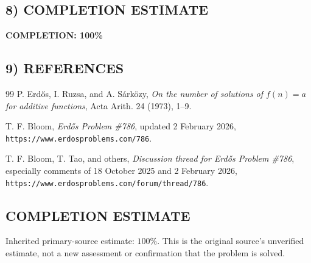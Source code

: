 \subsection*{8) COMPLETION ESTIMATE}
\textbf{COMPLETION: 100\%}

\subsection*{9) REFERENCES}
\begin{thebibliography}{99}
P. Erd\H{o}s, I. Ruzsa, and A. S\'ark\"ozy,
\emph{On the number of solutions of $f(n)=a$ for additive functions},
Acta Arith. 24 (1973), 1--9.

T. F. Bloom,
\emph{Erd\H{o}s Problem \#786}, updated 2 February 2026,
\texttt{https://www.erdosproblems.com/786}.

T. F. Bloom, T. Tao, and others,
\emph{Discussion thread for Erd\H{o}s Problem \#786}, especially comments of 18 October 2025 and 2 February 2026,
\texttt{https://www.erdosproblems.com/forum/thread/786}.
\end{thebibliography}



\subsection*{COMPLETION ESTIMATE}
Inherited primary-source estimate: $100\%$. This is the original source's unverified estimate, not a new assessment or confirmation that the problem is solved.
